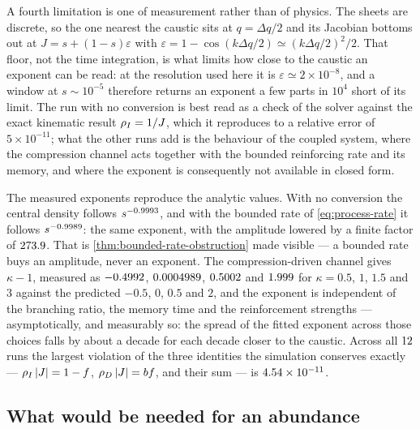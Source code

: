 A fourth limitation is one of measurement rather than of physics. The sheets
are discrete, so the one nearest the caustic sits at $q=\Delta q/2$ and its
Jacobian bottoms out at $J=s+(1-s)\varepsilon$ with
$\varepsilon=1-\cos(k\Delta q/2)\simeq(k\Delta q/2)^2/2$. That floor, not the
time integration, is what limits how close to the caustic an exponent can be
read: at the resolution used here it is $\varepsilon\simeq2\times10^{-8}$, and
a window at $s\sim10^{-5}$ therefore returns an exponent a few parts in $10^4$
short of its limit. The run with no conversion is best read as a check of the
solver against the exact kinematic result $\rho_{I}=1/J$, which it reproduces to a
relative error of $5\times10^{-11}$; what the other runs add is the behaviour of
the coupled system, where the compression channel acts together with the
bounded reinforcing rate and its memory, and where the exponent is consequently
not available in closed form.

The measured exponents reproduce the analytic values. With no conversion the
central density follows $s^{-0.9993}$, and with the bounded
rate of \cref{eq:process-rate} it follows $s^{-0.9989}$:
the same exponent, with the amplitude lowered by a finite factor of
$273.9$. That is
\cref{thm:bounded-rate-obstruction} made visible --- a bounded rate buys an
amplitude, never an exponent. The compression-driven channel gives $\kappa-1$,
measured as $-0.4992$,
$0.0004989$,
$0.5002$ and
$1.999$ for $\kappa=0.5$, $1$, $1.5$ and $3$
against the predicted $-0.5$, $0$, $0.5$ and $2$, and the exponent is
independent of the branching ratio, the memory time and the reinforcement
strengths --- asymptotically, and measurably so: the spread of the fitted
exponent across those choices falls by about a decade for each decade closer
to the caustic. Across all $12$ runs the largest
violation of the three identities the simulation conserves exactly ---
$\rho_{I}\left|J\right|=1-f$, $\rho_{D}\left|J\right|=bf$, and their sum ---
is $\num{4.54e-11}$.

\subsection{What would be needed for an abundance}\label{sec:defects-abundance}

